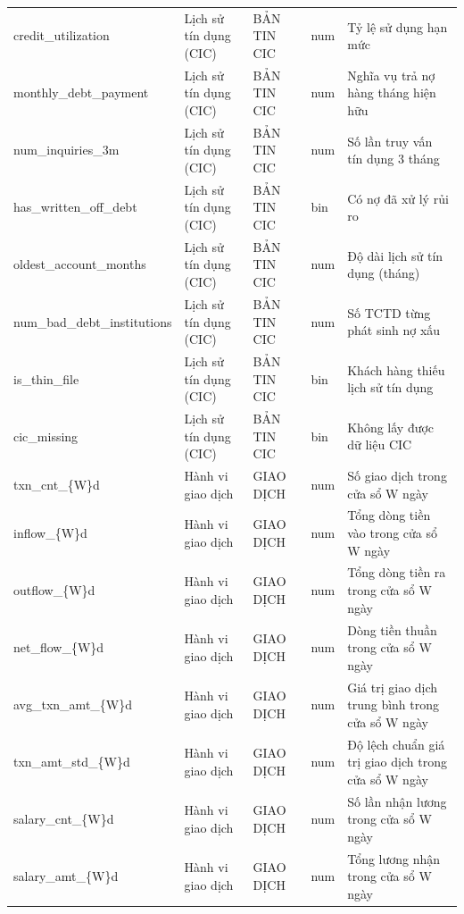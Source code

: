 \begin{longtable}{@{}L{3.761cm}L{2.121cm}L{2.314cm}L{1.061cm}L{4.918cm}@{}}
credit\_\allowbreak utilization & Lịch sử tín dụng (CIC) & BẢN TIN CIC & num & Tỷ lệ sử dụng hạn mức \\
monthly\_\allowbreak debt\_\allowbreak payment & Lịch sử tín dụng (CIC) & BẢN TIN CIC & num & Nghĩa vụ trả nợ hàng tháng hiện hữu \\
num\_\allowbreak inquiries\_\allowbreak 3m & Lịch sử tín dụng (CIC) & BẢN TIN CIC & num & Số lần truy vấn tín dụng 3 tháng \\
has\_\allowbreak written\_\allowbreak off\_\allowbreak debt & Lịch sử tín dụng (CIC) & BẢN TIN CIC & bin & Có nợ đã xử lý rủi ro \\
oldest\_\allowbreak account\_\allowbreak months & Lịch sử tín dụng (CIC) & BẢN TIN CIC & num & Độ dài lịch sử tín dụng (tháng) \\
num\_\allowbreak bad\_\allowbreak debt\_\allowbreak institutions & Lịch sử tín dụng (CIC) & BẢN TIN CIC & num & Số TCTD từng phát sinh nợ xấu \\
is\_\allowbreak thin\_\allowbreak file & Lịch sử tín dụng (CIC) & BẢN TIN CIC & bin & Khách hàng thiếu lịch sử tín dụng \\
cic\_\allowbreak missing & Lịch sử tín dụng (CIC) & BẢN TIN CIC & bin & Không lấy được dữ liệu CIC \\
txn\_\allowbreak cnt\_\allowbreak \{W\}d & Hành vi giao dịch & GIAO DỊCH & num & Số giao dịch trong cửa sổ W ngày \\
inflow\_\allowbreak \{W\}d & Hành vi giao dịch & GIAO DỊCH & num & Tổng dòng tiền vào trong cửa sổ W ngày \\
outflow\_\allowbreak \{W\}d & Hành vi giao dịch & GIAO DỊCH & num & Tổng dòng tiền ra trong cửa sổ W ngày \\
net\_\allowbreak flow\_\allowbreak \{W\}d & Hành vi giao dịch & GIAO DỊCH & num & Dòng tiền thuần trong cửa sổ W ngày \\
avg\_\allowbreak txn\_\allowbreak amt\_\allowbreak \{W\}d & Hành vi giao dịch & GIAO DỊCH & num & Giá trị giao dịch trung bình trong cửa sổ W ngày \\
txn\_\allowbreak amt\_\allowbreak std\_\allowbreak \{W\}d & Hành vi giao dịch & GIAO DỊCH & num & Độ lệch chuẩn giá trị giao dịch trong cửa sổ W ngày \\
salary\_\allowbreak cnt\_\allowbreak \{W\}d & Hành vi giao dịch & GIAO DỊCH & num & Số lần nhận lương trong cửa sổ W ngày \\
salary\_\allowbreak amt\_\allowbreak \{W\}d & Hành vi giao dịch & GIAO DỊCH & num & Tổng lương nhận trong cửa sổ W ngày \\

\end{longtable}
